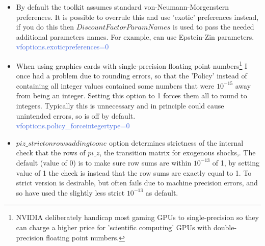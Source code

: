 \begin{itemize}
    (By default it assumes you have input a function. Setting $vfoptions.returnmatrix=1$ tells the codes you have inputed it as a matrix. When using GPU just ignore this option.)
  \item By default the toolkit assumes standard von-Neumann-Morgenstern preferences. It is possible to overrule this and use 'exotic' preferences instead, if you do this then $DiscountFactorParamNames$ is
    used to pass the needed additional parameters names. For example, can use Epstein-Zin parameters. \\
    \textcolor{RoyalBlue}{vfoptions.exoticpreferences=0}
  \item When using graphics cards with single-precision floating point numbers\footnote{NVIDIA deliberately handicap most gaming GPUs to single-precision so they can charge a higher price for 'scientific computing'
    GPUs with double-precision floating point numbers.} I once had a problem due to rounding errors, so that the 'Policy' instead of containing all integer values contained some numbers
    that were $10^{-15}$ away from being an integer. Setting this option to 1 forces them all to round to integers. Typically this is unnecessary and in principle could cause unintended errors, so is off by default. \\
    \textcolor{RoyalBlue}{vfoptions.policy\_{}forceintegertype=0}
  \item $piz\_{}strictonrowsaddingtoone$ option determines strictness of the internal check that the rows of $pi\_{}z$, the transition matrix for exogenous shocks,. The default (value of 0) is to make sure row sums are within $10^{-13}$ of 1, by setting value of 1 the check is instead that the row sums are exactly equal to 1. To strict version is desirable, but often fails due to machine precision errors, and so have used the slightly less strict $10^{-13}$ as default.
\end{itemize}


